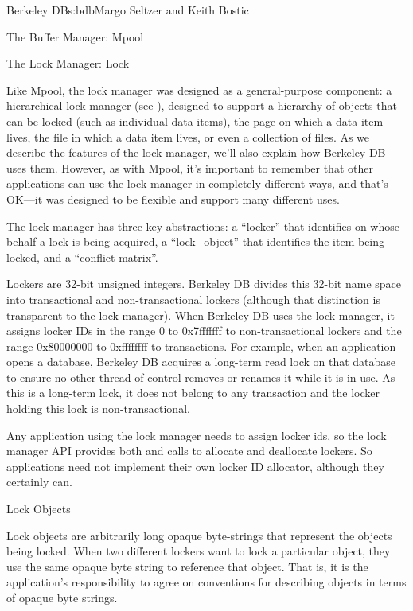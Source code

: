 \begin{aosachapter}{Berkeley DB}{s:bdb}{Margo Seltzer and Keith Bostic}
\begin{aosasect1}{The Buffer Manager: Mpool}
\end{aosasect1}

\begin{aosasect1}{The Lock Manager: Lock}


Like Mpool, the lock manager was designed as a general-purpose
component: a hierarchical lock manager (see \cite{bib:gray:lock}),
designed to support a hierarchy of objects that can be locked (such as
individual data items), the page on which a data item lives, the file
in which a data item lives, or even a collection of files. As we
describe the features of the lock manager, we'll also explain how
Berkeley DB uses them.  However, as with Mpool, it's important to
remember that other applications can use the lock manager in
completely different ways, and that's OK---it was designed to be
flexible and support many different uses.

The lock manager has three key abstractions: a ``locker'' that identifies
on whose behalf a lock is being acquired, a ``lock\_object'' that
identifies the item being locked, and a ``conflict matrix''.

Lockers are 32-bit unsigned integers. Berkeley DB divides this 32-bit
name space into transactional and non-transactional lockers (although
that distinction is transparent to the lock manager).  When Berkeley
DB uses the lock manager, it assigns locker IDs in the range 0 to
0x7fffffff to non-transactional lockers and the range 0x80000000 to
0xffffffff to transactions. For example, when an application opens a
database, Berkeley DB acquires a long-term read lock on that database
to ensure no other thread of control removes or renames it while it is
in-use. As this is a long-term lock, it does not belong to any
transaction and the locker holding this lock is non-transactional.

Any application using the lock manager needs to assign locker ids, so
the lock manager API provides both 
and  calls to allocate and
deallocate lockers.  So applications need not implement
their own locker ID allocator, although they certainly can.

\begin{aosasect2}{Lock Objects}

Lock objects are arbitrarily long opaque byte-strings that represent
the objects being locked. When two different lockers want to lock a
particular object, they use the same opaque byte string to reference
that object.  That is, it is the application's responsibility to agree
on conventions for describing objects in terms of opaque byte strings.


\end{aosasect2}
\end{aosasect1}
\end{aosachapter}
